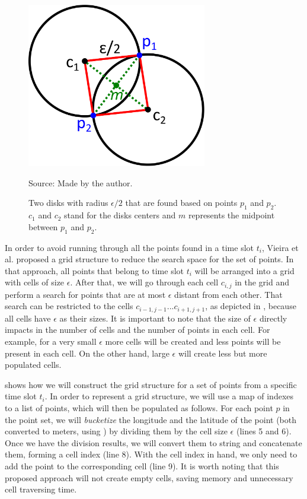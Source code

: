 \begin{figure}[h!]
    \centering
    \caption{Two disks with radius $\epsilon/2$ that are found based on points $p_1$ and $p_2$. $c_1$ and $c_2$ stand
        for the disks centers and $m$ represents the midpoint between $p_1$ and $p_2$.}
    \centerline{\includegraphics[width=0.7\textwidth]{images/disks_discovery.eps}}
    \footnotesize{Source: Made by the author.}
    \label{fig:disks_discovery}
\end{figure}

In order to avoid running  through all the points found in a time slot $t_i$, Vieira et al.
\citep{vieira} proposed a grid structure to reduce the search space for the set of points. In that approach, all points
that belong to time slot $t_i$ will be arranged into a grid with cells of size $\epsilon$. After that, we will go
through each cell $c_{i,j}$ in the grid and perform a search for points that are at most $\epsilon$ distant from each
other. That search can be restricted to the cells $c_{i - 1, j - 1} ... c_{i + 1, j + 1}$, as depicted in
, because all cells have $\epsilon$ as their sizes. It is important to note that the size of $\epsilon$
directly impacts in the number of cells and the number of points in each cell. For example, for a very small $\epsilon$
more cells will be created and less points will be present in each cell. On the other hand, large $\epsilon$ will create
less but more populated cells.

 shows how we will construct the grid structure for a set of points from a specific time slot $t_i$.
In order to represent a grid structure, we will use a map of indexes to a list of points, which will then be populated
as follows. For each point $p$ in the point set, we will \textit{bucketize} the longitude and the latitude of the point
(both converted to meters, using ) by dividing them by the cell size $\epsilon$ (lines 5 and 6).
Once we have the division results, we will convert them to string and concatenate them, forming a cell index (line 8).
With the cell index in hand, we only need to add the point to the corresponding cell (line 9). It is worth noting that
this proposed approach will not create empty cells, saving memory and unnecessary cell traversing time.

